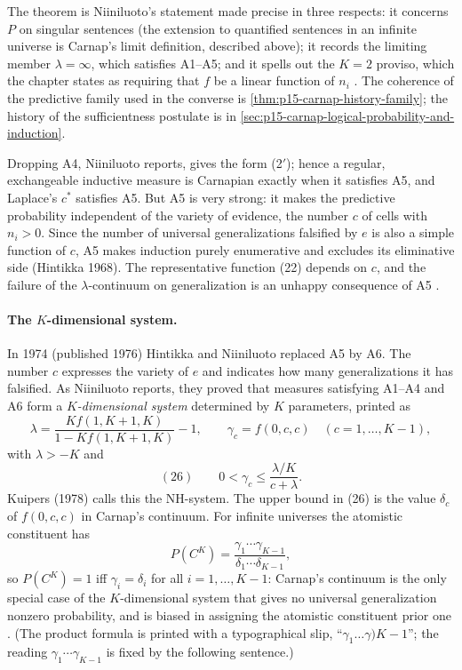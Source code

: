 The theorem is Niiniluoto's statement made precise in three respects: it
concerns \(P\) on singular sentences (the extension to quantified
sentences in an infinite universe is Carnap's limit definition, described
above); it records the limiting member \(\lambda=\infty\), which satisfies
A1--A5; and it spells out the \(K=2\) proviso, which the chapter states as
requiring that \(f\) be a linear function of \(n_i\)
\cite[p.~323]{Niiniluoto2011HintikkaProgramReading}. The coherence of the
predictive family used in the converse is
\cref{thm:p15-carnap-history-family}; the history of the sufficientness
postulate is in \cref{sec:p15-carnap-logical-probability-and-induction}.

Dropping A4, Niiniluoto reports, gives the form (2\('\)); hence a regular,
exchangeable inductive measure is Carnapian exactly when it satisfies A5,
and Laplace's \(c^*\) satisfies A5. But A5 is very strong: it makes the
predictive probability independent of the variety of evidence, the number
\(c\) of cells with \(n_i>0\). Since the number of universal
generalizations falsified by \(e\) is also a simple function of \(c\), A5
makes induction purely enumerative and excludes its eliminative side
(Hintikka 1968). The representative function (22) depends on \(c\), and
the failure of the \(\lambda\)-continuum on generalization is an unhappy
consequence of A5 \cite[p.~323]{Niiniluoto2011HintikkaProgramReading}.

\paragraph{The \(K\)-dimensional system.} In 1974 (published 1976)
Hintikka and Niiniluoto replaced A5 by A6. The number \(c\) expresses the
variety of \(e\) and indicates how many generalizations it has falsified.
As Niiniluoto reports, they proved that measures satisfying A1--A4 and A6
form a \emph{\(K\)-dimensional system} determined by \(K\) parameters,
printed as
\[
 \lambda=\frac{Kf(1,K+1,K)}{1-Kf(1,K+1,K)}-1,\qquad
 \gamma_c=f(0,c,c)\quad(c=1,\ldots,K-1),
\]
with \(\lambda>-K\) and
\[
 (26)\qquad 0<\gamma_c\leq\frac{\lambda/K}{c+\lambda}.
\]
Kuipers (1978) calls this the NH-system. The upper bound in (26) is the
value \(\delta_c\) of \(f(0,c,c)\) in Carnap's continuum. For infinite
universes the atomistic constituent has
\[
 P(C^K)=\frac{\gamma_1\cdots\gamma_{K-1}}{\delta_1\cdots\delta_{K-1}},
\]
so \(P(C^K)=1\) iff \(\gamma_i=\delta_i\) for all \(i=1,\ldots,K-1\): Carnap's
continuum is the only special case of the \(K\)-dimensional system that
gives no universal generalization nonzero probability, and is biased in
assigning the atomistic constituent prior one
\cite[p.~324]{Niiniluoto2011HintikkaProgramReading}. (The product formula
is printed with a typographical slip, ``\(\gamma_1\ldots\gamma)K-1\)'';
the reading \(\gamma_1\cdots\gamma_{K-1}\) is fixed by the following
sentence.)

